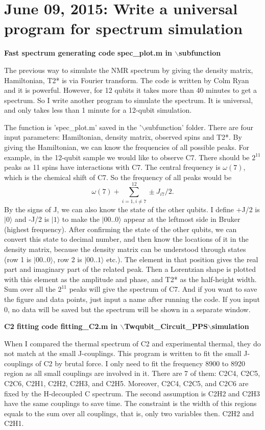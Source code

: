 \documentclass[prl,onecolumn]{revtex4-1}
\newcommand{\ket}[1]{|#1\rangle}
\newcommand{\dir}{$\backslash$}
\newcommand{\be}{\begin{equation}}
\newcommand{\ee}{\end{equation}}
\begin{document}
\newpage
\section{June 09, 2015: Write a universal program for spectrum simulation}

\textbf{Fast spectrum generating code spec\_plot.m in \dir subfunction}

The previous way to simulate the NMR spectrum by giving the density matrix, Hamiltonian, T2* is via Fourier transform. The code is written by Colm Ryan and it is powerful. However, for 12 qubits it takes more than 40 minutes to get a spectrum. So I write another program to simulate the spectrum. It is universal, and only takes less than 1 minute for a 12-qubit simulation.

The function is 'spec\_plot.m' saved in the '\dir subfunction' folder. There are four input parameters: Hamiltonian, density matrix, observed spins and T2*. By giving the Hamiltonian, we can know the frequencies of all possible peaks. For example, in the 12-qubit sample we would like to observe C7. There should be $2^{11}$ peaks as 11 spins have interactions with C7. The central frequency is $\omega(7)$, which is the chemical shift of C7. So the frequency of all peaks would be
\be
\omega(7)+\sum_{i=1,i\neq 7}^{12} \pm J_{i7}/2.
\ee
By the signs of J, we can also know the state of the other qubits. I define +J/2 is $\ket{0}$ and -J/2 is $\ket{1}$ to make the $\ket{00..0}$ appear at  the leftmost side in Bruker (highest frequency). After confirming the state of the other qubits, we can convert this state to decimal number, and then know the locations of it in the density matrix, because the density matrix can be understood through states (row 1 is $\ket{00..0}$, row 2 is $\ket{00..1}$ etc.). The element in that position gives the real part and imaginary part of the related peak. Then a Lorentzian shape is plotted with this element as the amplitude and phase, and T2* as the half-height width. Sum over all the $2^{11}$ peaks will give the spectrum of C7. And if you want to save the figure and data points, just input a name after running the code. If you input 0, no data will be saved but the spectrum will be shown in a separate window.

\textbf{C2 fitting code fitting\_C2.m in \dir Twqubit\_Circuit\_PPS\dir simulation}

When I compared the thermal spectrum of C2 and experimental thermal, they do not match at the small J-couplings. This program is written to fit the small J-couplings of C2 by brutal force. I only need to fit the frequency 8900 to 8920 region as all small couplings are involved in it. There are 7 of them: C2C4, C2C5, C2C6, C2H1, C2H2, C2H3, and C2H5. Moreover, C2C4, C2C5, and C2C6 are fixed by the H-decoupled C spectrum. The second assumption is C2H2 and C2H3 have the same couplings to save time. The constraint is the width of this regions equals to the sum over all couplings, that is, only two variables then. C2H2 and C2H1.
\end{document}

